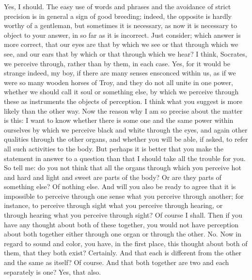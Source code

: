 \documentclass[letterpaper,12pt]{article}
\newcommand{\stephpag}[1]{\marginnote{\small\itshape\fontfamily{ppl}\selectfont #1}}
\begin{document}
\begin{drama}
\theaetetusspeaks
Yes, I should. \stephpag{c}
\socratesspeaks
The easy use of words and phrases and the avoidance of strict precision is in general a sign of good breeding; indeed, the opposite is hardly worthy of a gentleman, but sometimes it is necessary, as now it is necessary to object to your answer, in so far as it is incorrect. Just consider; which answer is more correct, that our eyes are that by which we see or that through which we see, and our ears that by which or that through which we hear?
\theaetetusspeaks
I think, Socrates, we perceive through, rather than by them, in each case. \stephpag{d}
\socratesspeaks
Yes, for it would be strange indeed, my boy, if there are many senses ensconced within us, as if we were so many wooden horses of Troy, and they do not all unite in one power, whether we should call it soul or something else, by which we perceive through these as instruments the objects of perception.
\theaetetusspeaks
I think what you suggest is more likely than the other way.
\socratesspeaks
Now the reason why I am so precise about the matter is this: I want to know whether there is some one and the same power within ourselves by which we perceive black and white through the eyes, and again other qualities \stephpag{e} through the other organs, and whether you will be able, if asked, to refer all such activities to the body. But perhaps it is better that you make the statement in answer to a question than that I should take all the trouble for you. So tell me: do you not think that all the organs through which you perceive hot and hard and light and sweet are parts of the body? Or are they parts of something else?
\theaetetusspeaks
Of nothing else.
\socratesspeaks
And will you also be ready to agree that it is impossible to perceive through one sense \stephpag{185 a} what you perceive through another; for instance, to perceive through sight what you perceive through hearing, or through hearing what you perceive through sight?
\theaetetusspeaks
Of course I shall.
\socratesspeaks
Then if you have any thought about both of these together, you would not have perception about both together either through one organ or through the other.
\theaetetusspeaks
No.
\socratesspeaks
Now in regard to sound and color, you have, in the first place, this thought about both of them, that they both exist?
\theaetetusspeaks
Certainly.
\socratesspeaks
And that each is different from the other and the same as itself? \stephpag{b}
\theaetetusspeaks
Of course.
\socratesspeaks
And that both together are two and each separately is one?
\theaetetusspeaks
Yes, that also.

\end{drama}
\end{document}
